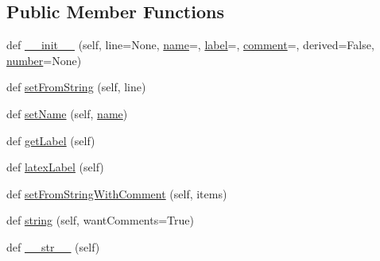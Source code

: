 \subsection*{Public Member Functions}
\begin{DoxyCompactItemize}
\item 
def \mbox{\hyperlink{classgetdist_1_1paramnames_1_1ParamInfo_ac84b3807f29c2c25430ff7cd31ac298c}{\+\_\+\+\_\+init\+\_\+\+\_\+}} (self, line=None, \mbox{\hyperlink{classgetdist_1_1paramnames_1_1ParamInfo_afbbc9d0845233cbdb99137ff23b92cbd}{name}}=\textquotesingle{}\textquotesingle{}, \mbox{\hyperlink{classgetdist_1_1paramnames_1_1ParamInfo_a9db4ac644cf038d4c325de7a26fd4f20}{label}}=\textquotesingle{}\textquotesingle{}, \mbox{\hyperlink{classgetdist_1_1paramnames_1_1ParamInfo_abdee12df655600eba9bb61a100b2920b}{comment}}=\textquotesingle{}\textquotesingle{}, derived=False, \mbox{\hyperlink{classgetdist_1_1paramnames_1_1ParamInfo_ab94916bce53105db07e78ab672a7a314}{number}}=None)
\item 
def \mbox{\hyperlink{classgetdist_1_1paramnames_1_1ParamInfo_a9959ca38efbef580c4322fe1003f49ae}{set\+From\+String}} (self, line)
\item 
def \mbox{\hyperlink{classgetdist_1_1paramnames_1_1ParamInfo_aac1142515954029d6c6039eab3e42f46}{set\+Name}} (self, \mbox{\hyperlink{classgetdist_1_1paramnames_1_1ParamInfo_afbbc9d0845233cbdb99137ff23b92cbd}{name}})
\item 
def \mbox{\hyperlink{classgetdist_1_1paramnames_1_1ParamInfo_a0d07efab6ae9148d54bba8515d7ff34d}{get\+Label}} (self)
\item 
def \mbox{\hyperlink{classgetdist_1_1paramnames_1_1ParamInfo_a7f0ccb0f7d6ed71f864ac8b33d352fe7}{latex\+Label}} (self)
\item 
def \mbox{\hyperlink{classgetdist_1_1paramnames_1_1ParamInfo_aa0a42d010bdc8b85811ebdcaf7f3a299}{set\+From\+String\+With\+Comment}} (self, items)
\item 
def \mbox{\hyperlink{classgetdist_1_1paramnames_1_1ParamInfo_aae31c25dc1dba70255c2d388bd49d742}{string}} (self, want\+Comments=True)
\item 
def \mbox{\hyperlink{classgetdist_1_1paramnames_1_1ParamInfo_a15bd2f5866334a64ac62a19db186ee7a}{\+\_\+\+\_\+str\+\_\+\+\_\+}} (self)
\end{DoxyCompactItemize}
